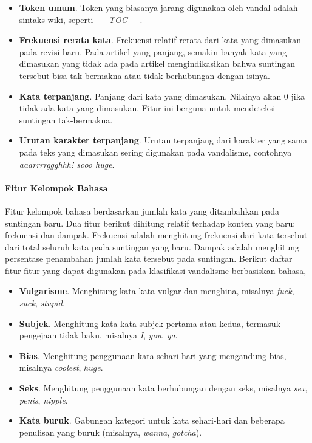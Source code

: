 \begin{itemize}
\item \textbf{Token umum}.
Token yang biasanya jarang digunakan oleh vandal adalah sintaks wiki, seperti \textit{\_\_TOC\_\_}.

\item \textbf{Frekuensi rerata kata}.
Frekuensi relatif rerata dari kata yang dimasukan pada revisi baru.
Pada artikel yang panjang, semakin banyak kata yang dimasukan yang tidak ada pada artikel mengindikasikan bahwa suntingan tersebut bisa tak bermakna atau tidak berhubungan dengan isinya.

\item \textbf{Kata terpanjang}.
Panjang dari kata yang dimasukan.
Nilainya akan 0 jika tidak ada kata yang dimasukan.
Fitur ini berguna untuk mendeteksi suntingan tak-bermakna.

\item \textbf{Urutan karakter terpanjang}.
Urutan terpanjang dari karakter yang sama pada teks yang dimasukan sering digunakan pada vandalisme, contohnya \textit{aaarrrrggghhh! sooo huge}.

\end{itemize}

\paragraph{Fitur Kelompok Bahasa}

Fitur kelompok bahasa berdasarkan jumlah kata yang ditambahkan pada suntingan baru.
Dua fitur berikut dihitung relatif terhadap konten yang baru: frekuensi dan dampak.
Frekuensi adalah menghitung frekuensi dari kata tersebut dari total seluruh kata pada suntingan yang baru.
Dampak adalah menghitung persentase penambahan jumlah kata tersebut pada suntingan.
Berikut daftar fitur-fitur yang dapat digunakan pada klasifikasi vandalisme berbasiskan bahasa,

\begin{itemize}
\item \textbf{Vulgarisme}.
Menghitung kata-kata vulgar dan menghina, misalnya \textit{fuck}, \textit{suck}, \textit{stupid}.

\item \textbf{Subjek}.
Menghitung kata-kata subjek pertama atau kedua, termasuk pengejaan tidak baku, misalnya \textit{I}, \textit{you}, \textit{ya}.

\item \textbf{Bias}.
Menghitung penggunaan kata sehari-hari yang mengandung bias, misalnya \textit{coolest}, \textit{huge}.

\item \textbf{Seks}.
Menghitung penggunaan kata berhubungan dengan seks, misalnya \textit{sex}, \textit{penis}, \textit{nipple}.

\item \textbf{Kata buruk}.
Gabungan kategori untuk kata sehari-hari dan beberapa penulisan yang buruk (misalnya, \textit{wanna}, \textit{gotcha}).

\end{itemize}

